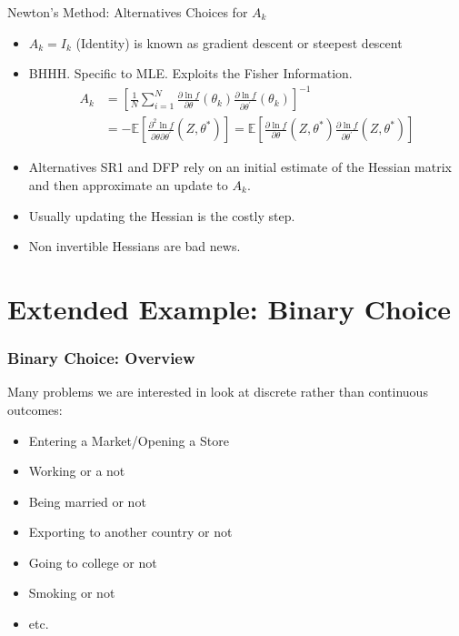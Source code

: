 \documentclass[xcolor=pdftex,dvipsnames,table,mathserif,aspectratio=169]{beamer}
\begin{document}
\begin{frame}{Newton's Method: Alternatives}
Choices for $A_k$
\begin{itemize}
\item $A_k= I_{k}$ (Identity) is known as \alert{gradient descent} or \alert{steepest descent}
\item BHHH. Specific to MLE. Exploits the \alert{Fisher Information}.
\begin{align*}
A _ { k } 
&= \left[ \frac { 1 } { N } \sum _ { i = 1 } ^ { N } \frac { \partial \ln f } { \partial \theta } \left( \theta _ { k } \right) \frac { \partial \ln f } { \partial \theta ^ { \prime } } \left( \theta _ { k } \right) \right] ^ { - 1 }\\
&=- \mathbb { E } \left[ \frac { \partial ^ { 2 } \ln f } { \partial \theta \partial \theta ^ { \prime } } \left( Z , \theta ^ { * } \right) \right] 
= \mathbb { E } \left[ \frac { \partial \ln f } { \partial \theta } \left( Z , \theta ^ { * } \right) \frac { \partial \ln f } { \partial \theta ^ { \prime } } \left( Z , \theta ^ { * } \right) \right]
\end{align*}
\item Alternatives \alert{SR1} and \alert{DFP} rely on an initial estimate of the Hessian matrix and then approximate an update to $A_k$.
\item Usually updating the Hessian is the costly step.
\item Non invertible Hessians are bad news.
\end{itemize}
\end{frame}

\section{Extended Example: Binary Choice}
\begin{frame}
\frametitle{Binary Choice: Overview}
Many problems we are interested in look at discrete rather than continuous outcomes:
\begin{itemize}
\item Entering a Market/Opening a Store
\item Working or a not
\item Being married or not
\item Exporting to another country or not
\item Going to college or not
\item Smoking or not
\item etc.
\end{itemize}
\end{frame}
\end{document}
